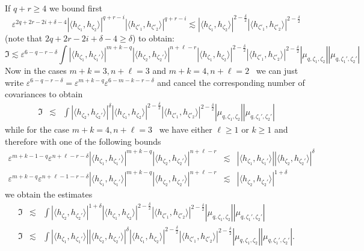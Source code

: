 If $q + r \geqslant 4$ we bound first
\[ \varepsilon^{2 q + 2 r - 2 i + \delta - 4} | \langle h_{\zeta_1},
   h_{\zeta_2} \rangle |^{q + r - i} | \langle h_{\zeta'_1}, h_{\zeta'_2}
   \rangle |^{q + r - i} \lesssim | \langle h_{\zeta_1}, h_{\zeta_2} \rangle
   |^{2 - \frac{\delta}{2}} | \langle h_{\zeta'_1}, h_{\zeta'_2} \rangle |^{2
   - \frac{\delta}{2}} \]
(note that $2 q + 2 r - 2 i + \delta - 4 \geqslant \delta$) to obtain:
\[ \mathfrak{I} \lesssim \varepsilon^{6 - q - r - \delta} \int | \langle
   h_{\zeta_1}, h_{\zeta_1'} \rangle |^{m + k - q} | \langle h_{\zeta_2},
   h_{\zeta_2'} \rangle |^{n + \ell - r} | \langle h_{\zeta_1}, h_{\zeta_2}
   \rangle |^{2 - \frac{\delta}{2}} | \langle h_{\zeta'_1}, h_{\zeta'_2}
   \rangle |^{2 - \frac{\delta}{2}} | \mu_{q, \zeta_1, \zeta_2} | | \mu_{q,
   \zeta_1', \zeta_2'} | \]
Now in the cases $m + k = 3, n + \ell = 3$ and $m + k = 4, n + \ell = 2$ \ we
can just write $\varepsilon^{6 - q - r - \delta} = \varepsilon^{m + k - q}
\varepsilon^{6 - m - k - r - \delta}$ and cancel the corresponding number of
covariances to obtain
\begin{eqnarray}
  \mathfrak{I} & \lesssim & \int | \langle h_{\zeta_2}, h_{\zeta_2'} \rangle
  |^{\delta} | \langle h_{\zeta_1}, h_{\zeta_2} \rangle |^{2 -
  \frac{\delta}{2}} | \langle h_{\zeta'_1}, h_{\zeta'_2} \rangle |^{2 -
  \frac{\delta}{2}} | \mu_{q, \zeta_1, \zeta_2} | | \mu_{q, \zeta_1',
  \zeta_2'} |  \label{e:graph-est-5}
\end{eqnarray}
while for the case $m + k = 4, n + \ell = 3$ \ we have either $\ell \geqslant
1$ or $k \geqslant 1$ and therefore with one of the following bounds
\begin{eqnarray*}
  \varepsilon^{m + k - 1 - q} \varepsilon^{n + \ell - r - \delta} | \langle
  h_{\zeta_1}, h_{\zeta_1'} \rangle |^{m + k - q} | \langle h_{\zeta_2},
  h_{\zeta_2'} \rangle |^{n + \ell - r} & \lesssim & | \langle h_{\zeta_1},
  h_{\zeta_1'} \rangle | | \langle h_{\zeta_2}, h_{\zeta_2'} \rangle
  |^{\delta}\\
  \varepsilon^{m + k - q} \varepsilon^{n + \ell - 1 - r - \delta} | \langle
  h_{\zeta_1}, h_{\zeta_1'} \rangle |^{m + k - q} | \langle h_{\zeta_2},
  h_{\zeta_2'} \rangle |^{n + \ell - r} & \lesssim & | \langle h_{\zeta_2},
  h_{\zeta_2'} \rangle |^{1 + \delta}
\end{eqnarray*}
we obtain the estimates
\begin{eqnarray}
  \mathfrak{I} & \lesssim & \int | \langle h_{\zeta_2}, h_{\zeta_2'} \rangle
  |^{1 + \delta} | \langle h_{\zeta_1}, h_{\zeta_2} \rangle |^{2 -
  \frac{\delta}{2}} | \langle h_{\zeta'_1}, h_{\zeta'_2} \rangle |^{2 -
  \frac{\delta}{2}} | \mu_{q, \zeta_1, \zeta_2} | | \mu_{q, \zeta_1',
  \zeta_2'} |  \label{e:graph-est-6}\\
  \mathfrak{I} & \lesssim & \int | \langle h_{\zeta_1}, h_{\zeta_1'} \rangle |
  | \langle h_{\zeta_2}, h_{\zeta_2'} \rangle |^{\delta} | \langle
  h_{\zeta_1}, h_{\zeta_2} \rangle |^{2 - \frac{\delta}{2}} | \langle
  h_{\zeta'_1}, h_{\zeta'_2} \rangle |^{2 - \frac{\delta}{2}} | \mu_{q,
  \zeta_1, \zeta_2} | | \mu_{q, \zeta_1', \zeta_2'} | .  \label{e:graph-est-7}
\end{eqnarray}
